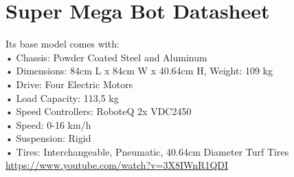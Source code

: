 
\section{Super Mega Bot Datasheet}
\label{AppA}

\begin{figure}[h]
	\begin{center} 
		\qquad
	\end{center}
\end{figure}
Its base model comes with:\\
•	Chassis: Powder Coated Steel and Aluminum \\
•	Dimensions: 84cm L x 84cm W x 40.64cm H, Weight: 109 kg\\
•	Drive: Four Electric Motors\\
•	Load Capacity: 113,5 kg\\
•	Speed Controllers: RoboteQ 2x VDC2450\\
•	Speed: 0-16 km/h \\
•	Suspension: Rigid\\
•	Tires: Interchangeable, Pneumatic, 40.64cm Diameter Turf Tires\\
\url{https://www.youtube.com/watch?v=3X8IWnR1QDI}
